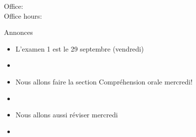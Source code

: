 \documentclass{beamer}
\subtitle[\lexi{Aller} et expressions temporelles]{Le verbe \lexi{aller} et les expressions temporelles}
\begin{document}
  \begin{frame}
    \titlepage
    \tiny{Office: \\
          Office hours: }
  \end{frame}

  \begin{frame}{Annonces}
    \begin{itemize}
      \item L'examen 1 est le 29 septembre (vendredi)
      \item[] 
      \item Nous allons faire la section Compréhension orale \alert{mercredi}!
      \item[] 
      \item Nous allons aussi réviser mercredi
      \item[] 
    \end{itemize}
  \end{frame}

\end{document}
